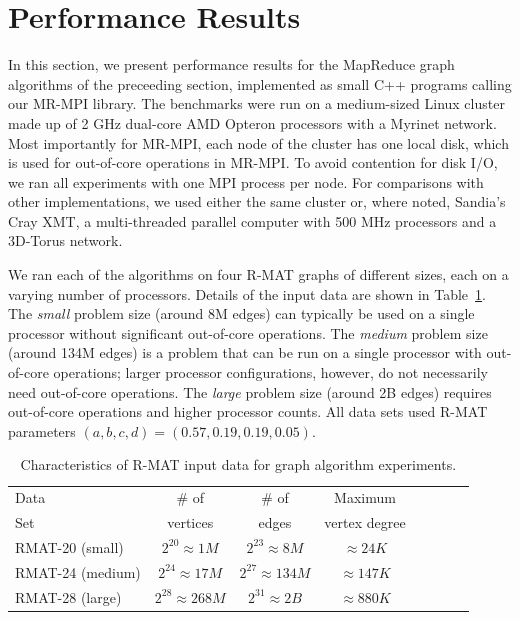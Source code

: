 \section{Performance Results}
\label{sec:results}

In this section, we present performance results for the MapReduce
graph algorithms of the preceeding section, implemented as small C++
programs calling our MR-MPI library.
The benchmarks were run on a medium-sized Linux cluster made up of 2 GHz
dual-core AMD Opteron processors with a Myrinet network.  Most importantly
for MR-MPI, each node of the cluster has one local disk, which is used
for out-of-core operations in MR-MPI.  To avoid contention for disk I/O, we 
ran all experiments with one MPI process per node.  For comparisons with
other implementations, we used either the same cluster or, where noted,
Sandia's Cray XMT, a multi-threaded parallel computer with 500 {MHz} processors
and a 3D-Torus network.

We ran each of the algorithms on four R-MAT graphs of
different sizes, each on a varying number of processors.  Details of the
input data are shown in Table~\ref{t:rmats}.
The {\it small} problem size (around 8M edges) can typically be used
on a single processor without significant out-of-core operations.
The {\it medium} problem size (around 134M edges) is a 
problem that can be run
on a single processor with out-of-core operations; larger processor 
configurations, however, do not necessarily need out-of-core operations.
The {\it large} problem size (around 2B
edges) requires out-of-core operations and higher processor counts.
All data sets used R-MAT parameters $(a, b, c, d) = (0.57, 0.19, 0.19, 0.05)$.

\begin{table}
\begin{center}
\begin{tabular}{|l|c|c|c|c|c|c|c|}
\hline
Data & \# of    & \# of & Maximum \\
Set  & vertices & edges & vertex degree\\
\hline
RMAT-20 (small)   &$2^{20} \approx 1M$ & $2^{23} \approx 8M$ &  $\approx 24K$ \\
RMAT-24 (medium)  &$2^{24} \approx 17M$ & $2^{27} \approx 134M$ &  $\approx 147K$ \\
RMAT-28 (large)   &$2^{28} \approx 268M$ & $2^{31} \approx 2B$& $\approx 880K$ \\
\hline
\end{tabular}
\caption{Characteristics of R-MAT input data for graph algorithm
experiments.}
\label{t:rmats}
\end{center}
\end{table}

